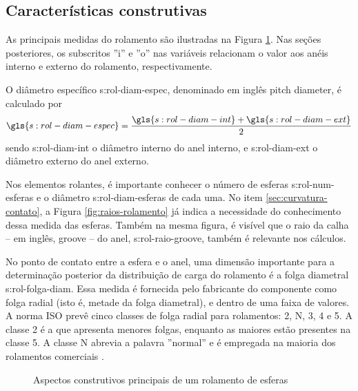 \documentclass[12pt,oneside,english,brazil,lmodern,siglas,simbolos,cite=num]{ucsmonograph}
\begin{document}
	\subsection{Características construtivas}
	As principais medidas do rolamento são ilustradas na Figura \ref{fig:rolamento-medidas}.
	Nas seções posteriores, os subscritos ''i'' e ''o'' nas variáveis relacionam o valor aos anéis interno e externo do rolamento, respectivamente.
	
	O diâmetro específico \gls{s:rol-diam-espec}, denominado em inglês \foreignlanguage{english}{pitch diameter}, é calculado por
	\begin{equation} \label{eqn:rol:diam-espec}
		\gls{s:rol-diam-espec} = \frac{\gls{s:rol-diam-int} + 
		\gls{s:rol-diam-ext}}{2}
	\end{equation}
	sendo \gls{s:rol-diam-int} o diâmetro interno do anel interno, e \gls{s:rol-diam-ext} o diâmetro externo do anel externo.
	
	Nos elementos rolantes, é importante conhecer o número de esferas \gls{s:rol-num-esferas} e o diâmetro \gls{s:rol-diam-esferas} de cada uma.
	No item \ref{sec:curvatura-contato}, a Figura \ref{fig:raios-rolamento} já indica a necessidade do conhecimento dessa medida das esferas.	
	Também na mesma figura, é visível que o raio da calha -- em inglês, \foreignlanguage{english}{groove} -- do anel, \gls{s:rol-raio-groove}, também é relevante nos cálculos.
	
	No ponto de contato entre a esfera e o anel, uma dimensão importante para a determinação posterior da distribuição de carga do rolamento é a folga diametral \gls{s:rol-folga-diam}.
	Essa medida é fornecida pelo fabricante do componente como folga radial (isto é, metade da folga diametral), e dentro de uma faixa de valores.
	A norma ISO prevê cinco classes de folga radial para rolamentos: 2, N, 3, 4 e 5. A classe 2 é a que apresenta menores folgas, enquanto as maiores estão presentes na classe 5.
	A classe N abrevia a palavra ''normal'' e é empregada na maioria dos rolamentos comerciais \cite{skfClearance}.
		
	\begin{figure}[t]
		\caption{Aspectos construtivos principais de um rolamento de esferas}
		\label{fig:rolamento-medidas}
	\end{figure}
\end{document}
